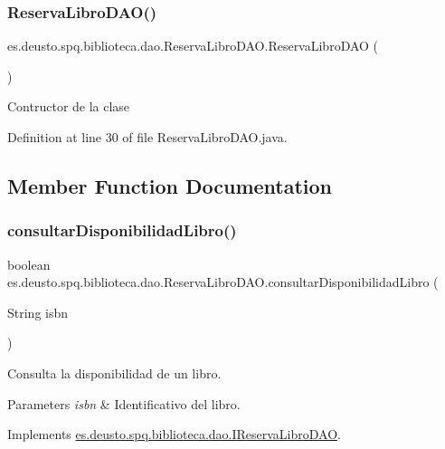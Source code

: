 \subsubsection{\texorpdfstring{Reserva\+Libro\+D\+A\+O()}{ReservaLibroDAO()}}
{\footnotesize\ttfamily es.\+deusto.\+spq.\+biblioteca.\+dao.\+Reserva\+Libro\+D\+A\+O.\+Reserva\+Libro\+D\+AO (\begin{DoxyParamCaption}{ }\end{DoxyParamCaption})}

Contructor de la clase 

Definition at line 30 of file Reserva\+Libro\+D\+A\+O.\+java.



\subsection{Member Function Documentation}
\mbox{\label{classes_1_1deusto_1_1spq_1_1biblioteca_1_1dao_1_1_reserva_libro_d_a_o_adf3ff587646760b081c538ca54512c3b}} 
\subsubsection{\texorpdfstring{consultar\+Disponibilidad\+Libro()}{consultarDisponibilidadLibro()}}
{\footnotesize\ttfamily boolean es.\+deusto.\+spq.\+biblioteca.\+dao.\+Reserva\+Libro\+D\+A\+O.\+consultar\+Disponibilidad\+Libro (\begin{DoxyParamCaption}\item[{String}]{isbn }\end{DoxyParamCaption})}

Consulta la disponibilidad de un libro. 
\begin{DoxyParams}{Parameters}
{\em isbn} & Identificativo del libro. \\
\hline
\end{DoxyParams}


Implements \mbox{\hyperlink{interfacees_1_1deusto_1_1spq_1_1biblioteca_1_1dao_1_1_i_reserva_libro_d_a_o_a56903b304697f889b59fb782a4e61aaf}{es.\+deusto.\+spq.\+biblioteca.\+dao.\+I\+Reserva\+Libro\+D\+AO}}.



